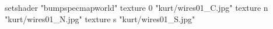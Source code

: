 setshader "bumpspecmapworld"
    texture 0 "kurt/wires01_C.jpg"
    texture n "kurt/wires01_N.jpg"
    texture s "kurt/wires01_S.jpg"